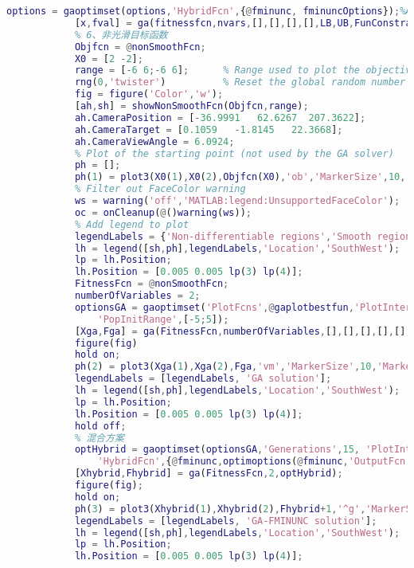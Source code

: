 \begin{lstlisting}[language = Matlab]
            options = gaoptimset(options,'HybridFcn',{@fminunc, fminuncOptions});%Adding a Hybrid Function
            [x,fval] = ga(fitnessfcn,nvars,[],[],[],[],LB,UB,FunConstraint,[],options)
            % 6、非光滑目标函数
            Objfcn = @nonSmoothFcn;
            X0 = [2 -2];
            range = [-6 6;-6 6];      % Range used to plot the objective function
            rng(0,'twister')          % Reset the global random number generator
            fig = figure('Color','w');
            [ah,sh] = showNonSmoothFcn(Objfcn,range);
            ah.CameraPosition = [-36.9991   62.6267  207.3622];
            ah.CameraTarget = [0.1059   -1.8145   22.3668];
            ah.CameraViewAngle = 6.0924;
            % Plot of the starting point (not used by the GA solver)
            ph = [];
            ph(1) = plot3(X0(1),X0(2),Objfcn(X0),'ob','MarkerSize',10,'MarkerFaceColor','b');
            % Filter out FaceColor warning
            ws = warning('off','MATLAB:legend:UnsupportedFaceColor');
            oc = onCleanup(@()warning(ws));
            % Add legend to plot
            legendLabels = {'Non-differentiable regions','Smooth regions','Start point'};
            lh = legend([sh,ph],legendLabels,'Location','SouthWest');
            lp = lh.Position;
            lh.Position = [0.005 0.005 lp(3) lp(4)];
            FitnessFcn = @nonSmoothFcn;
            numberOfVariables = 2;
            optionsGA = gaoptimset('PlotFcns',@gaplotbestfun,'PlotInterval',5, ...
                'PopInitRange',[-5;5]);
            [Xga,Fga] = ga(FitnessFcn,numberOfVariables,[],[],[],[],[],[],[],[],optionsGA)
            figure(fig)
            hold on;
            ph(2) = plot3(Xga(1),Xga(2),Fga,'vm','MarkerSize',10,'MarkerFaceColor','m');
            legendLabels = [legendLabels, 'GA solution'];
            lh = legend([sh,ph],legendLabels,'Location','SouthWest');
            lp = lh.Position;
            lh.Position = [0.005 0.005 lp(3) lp(4)];
            hold off;
            % 混合方案
            optHybrid = gaoptimset(optionsGA,'Generations',15, 'PlotInterval',1,...
                'HybridFcn',{@fminunc,optimoptions(@fminunc,'OutputFcn',@fminuncOut)});
            [Xhybrid,Fhybrid] = ga(FitnessFcn,2,optHybrid);
            figure(fig);
            hold on;
            ph(3) = plot3(Xhybrid(1),Xhybrid(2),Fhybrid+1,'^g','MarkerSize',10,'MarkerFaceColor','g');
            legendLabels = [legendLabels, 'GA-FMINUNC solution'];
            lh = legend([sh,ph],legendLabels,'Location','SouthWest');
            lp = lh.Position;
            lh.Position = [0.005 0.005 lp(3) lp(4)];

\end{lstlisting}
